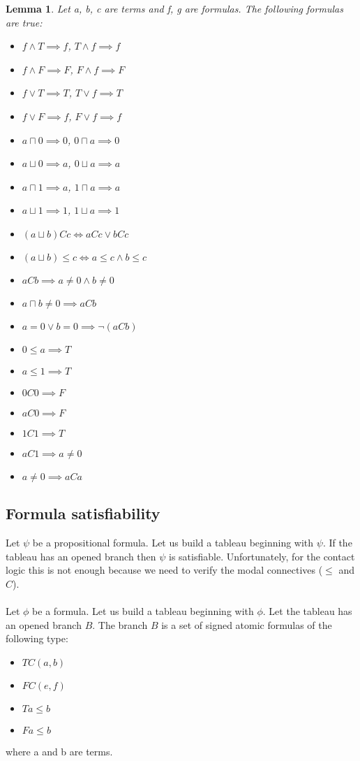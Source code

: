 \documentclass{article}
\newtheorem{lemma}[theorem]{Lemma}
\begin{document}
	\begin{lemma}
		Let a, b, c are terms and f, g are formulas. The following formulas are true:
		\begin{itemize}
			\item $f \land T \implies f$, $T \land f \implies f$
			\item $f \land F \implies F$, $F \land f \implies F$
			\item $f \lor T \implies T$, $T \lor f \implies T$
			\item $f \lor F \implies f$, $F \lor f \implies f$
			\item $a \sqcap 0 \implies 0$, $0 \sqcap a \implies 0$
			\item $a \sqcup 0 \implies a$, $0 \sqcup a \implies a$
			\item $a \sqcap 1 \implies a$, $1 \sqcap a \implies a$
			\item $a \sqcup 1 \implies 1$, $1 \sqcup a \implies 1$
			\item $(a \sqcup b)Cc \iff aCc \lor bCc$
			\item $(a \sqcup b) \leq c \iff a \leq c \land b \leq c$
			\item $aCb \implies a \neq 0 \land b \neq 0$
			\item $a \sqcap b \neq 0 \implies aCb$
			\item $a = 0 \lor b = 0 \implies \neg(aCb)$
			\item $0 \leq a \implies T$
			\item $a \leq 1 \implies T$
			\item $0C0 \implies F$
			\item $aC0 \implies F$
			\item $1C1 \implies T$
			\item $aC1 \implies a \neq 0$
			\item $a \neq 0 \implies aCa$
		\end{itemize}
	\end{lemma}

	\subsection{Formula satisfiability}
		Let $\psi$ be a propositional formula. Let us build a tableau beginning with $\psi$. If the tableau has an opened branch then $\psi$ is satisfiable. Unfortunately, for the contact logic this is not enough because we need to verify the modal connectives ($\leq$ and $C$).
		\paragraph{}
		Let $\phi$ be a formula. Let us build a tableau beginning with $\phi$. Let the tableau has an opened branch $B$. The branch $B$ is a set of signed atomic formulas of the following type:
		\begin{itemize}
			\item $T C(a,b)$
			\item $F C(e,f)$
			\item $T a \leq b$
			\item $F a \leq b$
		\end{itemize}
		where a and b are terms.
\end{document}
